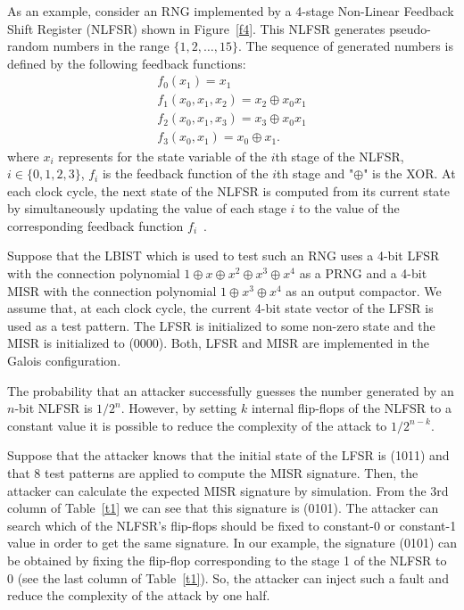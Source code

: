 \documentclass[a4paper]{llncs}
\begin{document}
As an example, consider an RNG implemented by a 4-stage Non-Linear Feedback Shift Register (NLFSR)  shown in Figure~\ref{f4}. This NLFSR generates pseudo-random numbers in the range $\{1,2,\ldots, 15\}$. The sequence of generated numbers is defined by the following feedback functions:
\[
\begin{array}{l}
f_0(x_1) = x_1 \\
f_1(x_0,x_1,x_2) = x_2 \oplus x_0 x_1 \\
f_2(x_0,x_1,x_3) = x_3 \oplus x_0 x_1 \\
f_3(x_0,x_1) = x_0 \oplus x_1.
\end{array}
\]
where $x_i$ represents for the state variable of the $i$th stage of the NLFSR, $i \in \{0,1,2,3\}$,
$f_i$ is the feedback function of the $i$th stage and "$\oplus$" is the XOR. 
At each clock cycle, 
the next state of the NLFSR is computed from its current state 
by simultaneously updating the value of each stage $i$
to the value of the corresponding feedback function $f_i$~\cite{Du09j}.

Suppose that the LBIST which is used to test such an RNG uses a 4-bit LFSR with the connection polynomial $1 \oplus x \oplus x^2 \oplus x^3 \oplus x^4$ as a PRNG and a 4-bit MISR with the connection polynomial $1 \oplus x^3 \oplus x^4$  as an output compactor. 
We assume that, at each clock cycle, the current 4-bit state vector of the LFSR is used as a test pattern. The LFSR is initialized to some non-zero state and the MISR is initialized to (0000).
Both, LFSR and MISR are implemented in the Galois configuration.

The probability that an attacker successfully 
guesses the number generated by an $n$-bit NLFSR is $1/2^n$.
However, by setting $k$ internal flip-flops of the NLFSR to a constant value
it is possible to reduce the complexity of the attack to $1/2^{n-k}$. 

Suppose that the attacker knows that the initial state of the LFSR is (1011) and that 8 test patterns are applied to compute the MISR signature. Then, the attacker can calculate the expected MISR signature by simulation. From the 3rd column of Table~\ref{t1} we can see that this signature is (0101). The attacker can search which of the NLFSR's flip-flops should be fixed to constant-0 or constant-1 value in order to get the same signature. In our example, the signature (0101) can be obtained by fixing the flip-flop corresponding to the stage 1 of the NLFSR to 0 (see the last column of Table~\ref{t1}). So, the attacker can inject such a fault and reduce the complexity of the attack by one half. 
\end{document}
